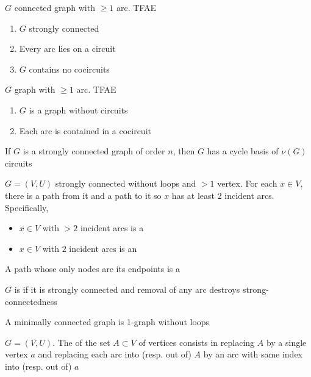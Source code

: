 \documentclass[aspectratio=169]{beamer}\usepackage[]{graphicx}\usepackage[]{xcolor}
\begin{document}
\begin{frame}
\begin{theorem}
$G$ connected graph with $\geq 1$ arc. TFAE
\begin{enumerate}
\item $G$ strongly connected
\item Every arc lies on a circuit
\item $G$ contains no cocircuits
\end{enumerate}
\end{theorem}
\end{frame}


\begin{frame}
\begin{theorem}
$G$ graph with $\geq 1$ arc. TFAE
\begin{enumerate}
\item $G$ is a graph without circuits
\item Each arc is contained in a cocircuit
\end{enumerate}
\end{theorem}
\vfill
\begin{theorem}
If $G$ is a strongly connected graph of order $n$, then $G$ has a cycle basis of $\nu(G)$ circuits
\end{theorem}
\end{frame}

\begin{frame}
\begin{definition}
$G=(V,U)$ strongly connected without loops and $>1$ vertex. For each $x\in V$, there is a path from it and a path to it so $x$ has at least 2 incident arcs. Specifically,
\begin{itemize}
\item $x\in V$ with $>2$ incident arcs is a 
\item $x\in V$ with $2$ incident arcs is an 
\end{itemize}
A path whose only nodes are its endpoints is a 
\end{definition}
\end{frame}

\begin{frame}
\begin{definition}
$G$ is  if it is strongly connected and removal of any arc destroys strong-connectedness
\end{definition}
A minimally connected graph is 1-graph without loops
\vfill
\begin{definition}[Contraction]
$G=(V,U)$. The  of the set $A\subset V$ of vertices consists in replacing $A$ by a single vertex $a$ and replacing each arc into (resp. out of) $A$ by an arc with same index into (resp. out of) $a$
\end{definition}
\end{frame}
\end{document}
